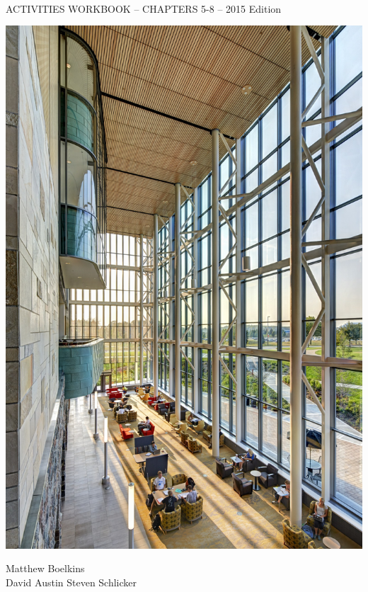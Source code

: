\documentclass{article}
\begin{document}
\color{covergreen}
\begin{center}
\fontsize{32pt}{48pt}\selectfont{} \\[8pt]
\fontsize{12pt}{14pt}\selectfont ACTIVITIES WORKBOOK -- CHAPTERS 5-8 -- 2015 Edition\\[10pt]
\end{center}
\begin{center}
\includegraphics[scale=.8]{ActiveCalculusCover.jpg}
\end{center}
\begin{center}
\fontsize{24pt}{32pt}\selectfont Matthew Boelkins\\
\fontsize{18pt}{24pt}\selectfont David Austin \quad Steven Schlicker
\end{center}
\end{document}
